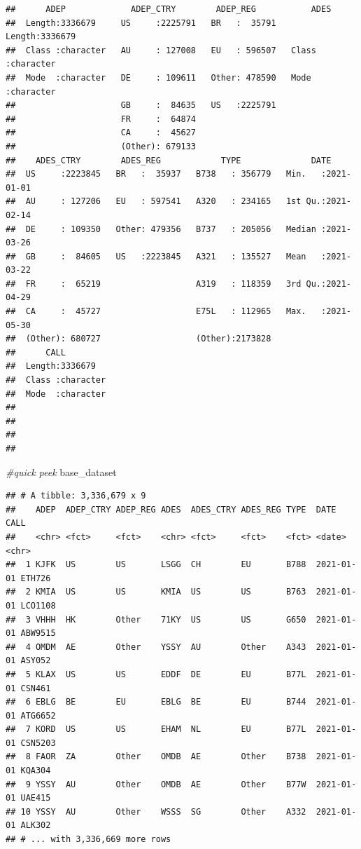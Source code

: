 \documentclass[conference,final,]{IEEEtran}
\newenvironment{Shaded}{\begin{snugshade}}{\end{snugshade}}
\newcommand{\CommentTok}[1]{\textcolor[rgb]{0.56,0.35,0.01}{\textit{#1}}}
\newcommand{\NormalTok}[1]{#1}
\begin{document}
\begin{verbatim}
##      ADEP             ADEP_CTRY        ADEP_REG           ADES          
##  Length:3336679     US     :2225791   BR   :  35791   Length:3336679    
##  Class :character   AU     : 127008   EU   : 596507   Class :character  
##  Mode  :character   DE     : 109611   Other: 478590   Mode  :character  
##                     GB     :  84635   US   :2225791                     
##                     FR     :  64874                                     
##                     CA     :  45627                                     
##                     (Other): 679133                                     
##    ADES_CTRY        ADES_REG            TYPE              DATE           
##  US     :2223845   BR   :  35937   B738   : 356779   Min.   :2021-01-01  
##  AU     : 127206   EU   : 597541   A320   : 234165   1st Qu.:2021-02-14  
##  DE     : 109350   Other: 479356   B737   : 205056   Median :2021-03-26  
##  GB     :  84605   US   :2223845   A321   : 135527   Mean   :2021-03-22  
##  FR     :  65219                   A319   : 118359   3rd Qu.:2021-04-29  
##  CA     :  45727                   E75L   : 112965   Max.   :2021-05-30  
##  (Other): 680727                   (Other):2173828                       
##      CALL          
##  Length:3336679    
##  Class :character  
##  Mode  :character  
##                    
##                    
##                    
## 
\end{verbatim}

\begin{Shaded}
\begin{Highlighting}[]
\CommentTok{\#quick peek}
\NormalTok{base\_dataset}
\end{Highlighting}
\end{Shaded}

\begin{verbatim}
## # A tibble: 3,336,679 x 9
##    ADEP  ADEP_CTRY ADEP_REG ADES  ADES_CTRY ADES_REG TYPE  DATE       CALL   
##    <chr> <fct>     <fct>    <chr> <fct>     <fct>    <fct> <date>     <chr>  
##  1 KJFK  US        US       LSGG  CH        EU       B788  2021-01-01 ETH726 
##  2 KMIA  US        US       KMIA  US        US       B763  2021-01-01 LCO1108
##  3 VHHH  HK        Other    71KY  US        US       G650  2021-01-01 ABW9515
##  4 OMDM  AE        Other    YSSY  AU        Other    A343  2021-01-01 ASY052 
##  5 KLAX  US        US       EDDF  DE        EU       B77L  2021-01-01 CSN461 
##  6 EBLG  BE        EU       EBLG  BE        EU       B744  2021-01-01 ATG6652
##  7 KORD  US        US       EHAM  NL        EU       B77L  2021-01-01 CSN5203
##  8 FAOR  ZA        Other    OMDB  AE        Other    B738  2021-01-01 KQA304 
##  9 YSSY  AU        Other    OMDB  AE        Other    B77W  2021-01-01 UAE415 
## 10 YSSY  AU        Other    WSSS  SG        Other    A332  2021-01-01 ALK302 
## # ... with 3,336,669 more rows
\end{verbatim}
\end{document}
